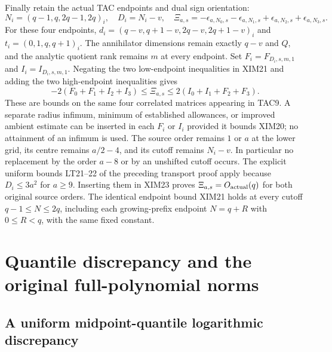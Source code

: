 Finally retain the actual TAC endpoints and dual sign orientation:
\[
 N_i=(q-1,q,2q-1,2q)_i,\quad D_i=N_i-v,\quad
 \Xi_{a,s}=-\epsilon_{a,N_0,s}-\epsilon_{a,N_1,s}
             +\epsilon_{a,N_2,s}+\epsilon_{a,N_3,s}.
 \tag{XIM22}
\]
For these four endpoints,
$d_i=(q-v,q+1-v,2q-v,2q+1-v)_i$ and
$t_i=(0,1,q,q+1)_i$. The annihilator dimensions remain exactly
$q-v$ and $Q$, and the analytic quotient rank remains $m$ at every
endpoint. Set $F_i=F_{D_i,s,m,1}$ and $I_i=I_{D_i,s,m,1}$.
Negating the two low-endpoint inequalities in XIM21 and adding the
two high-endpoint inequalities gives
\[
 \boxed{
 -2(F_0+F_1+I_2+I_3)
       \le\Xi_{a,s}\le
  2(I_0+I_1+F_2+F_3).}
 \tag{XIM23}
\]
These are bounds on the same four correlated matrices appearing in
TAC9. A separate radius infimum, minimum of established allowances,
or improved ambient estimate can be inserted in each $F_i$ or $I_i$
provided it bounds XIM20; no attainment of an infimum is used.
The source order remains $1$ or $a$ at the lower grid, its centre
remains $a/2-4$, and its cutoff remains $N_i-v$. In particular no
replacement by the order $a-8$ or by an unshifted cutoff occurs.
The explicit uniform bounds LT21--22 of the preceding transport proof
apply because $D_i\le3a^2$ for $a\ge9$. Inserting them in XIM23
proves $\Xi_{a,s}=O_{\rm actual}(q)$ for both original source orders.
The identical endpoint bound XIM21 holds at every cutoff
$q-1\le N\le2q$, including each growing-prefix endpoint $N=q+R$
with $0\le R<q$, with the same fixed constant.
\endgroup


\section{Quantile discrepancy and the original full-polynomial norms}
\label{sec:dual-web-equilibrium}


\subsection{A uniform midpoint-quantile logarithmic discrepancy}


